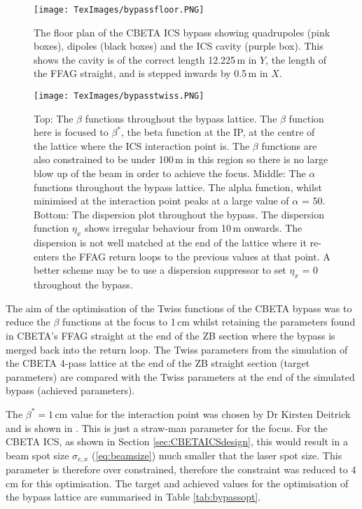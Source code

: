 \documentclass[11pt]{article}
\begin{document}
\begin{figure}[H]
\centering
\texttt{[image: TexImages/bypassfloor.PNG]}
\caption{\label{fig:bypassfloor} The floor plan of the CBETA ICS bypass showing quadrupoles (pink boxes), dipoles (black boxes) and the ICS cavity (purple box). This shows the cavity is of the correct length 12.225\,m in $Y$, the length of the FFAG straight, and is stepped inwards by 0.5\,m in $X$.}
\end{figure}

\begin{figure}[H]
\centering
\texttt{[image: TexImages/bypasstwiss.PNG]}
\caption{\label{fig:bypasstwiss} Top: The $\beta$ functions throughout the bypass lattice. The $\beta$ function here is focused to $\beta^{*}$, the beta function at the IP, at the centre of the lattice where the ICS interaction point is. The $\beta$ functions are also constrained to be under 100\,m in this region so there is no large blow up of the beam in order to achieve the focus. Middle: The $\alpha$ functions throughout the bypass lattice. The alpha function, whilst minimised at the interaction point peaks at a large value of $\alpha$ = 50. Bottom: The dispersion plot throughout the bypass. The dispersion function $\eta_{x}$ shows irregular behaviour from 10\,m onwards. The dispersion is not well matched at the end of the lattice where it re-enters the FFAG return loops to the previous values at that point. A better scheme may be to use a dispersion suppressor to set $\eta_{x}$ = 0 throughout the bypass.}
\end{figure}
 
The aim of the optimisation of the Twiss functions of the CBETA bypass was to reduce the $\beta$ functions at the focus to 1\,cm whilst retaining the parameters found in CBETA's FFAG straight at the end of the ZB section where the bypass is merged back into the return loop. The Twiss parameters from the simulation of the CBETA 4-pass lattice at the end of the ZB straight section (target parameters) are compared with the Twiss parameters at the end of the simulated bypass (achieved parameters). 

The $\beta^{*} = 1$\,cm value for the interaction point was chosen by Dr Kirsten Deitrick and is shown in \cite{KirstenIPAC}. This is just a straw-man parameter for the focus. For the CBETA ICS, as shown in Section \ref{sec:CBETAICSdesign}, this would result in a beam spot size $\sigma_{e,x}$ (\ref{eq:beamsize}) much smaller that the laser spot size. This parameter is therefore over constrained, therefore the constraint was reduced to 4\,cm for this optimisation. The target and achieved values for the optimisation of the bypass lattice are summarised in Table \ref{tab:bypassopt}.
\end{document}
